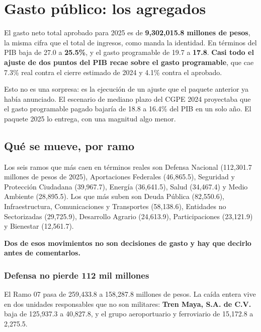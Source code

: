 \chapter{Gasto público: los agregados}

El gasto neto total aprobado para 2025 es de \textbf{9,302,015.8 millones de
pesos}, la misma cifra que el total de ingresos, como manda la identidad. En
términos del PIB baja de 27.0 a \textbf{25.5\%}, y el gasto programable de 19.7 a
\textbf{17.8}. \textbf{Casi todo el ajuste de dos puntos del PIB recae sobre el
gasto programable}, que cae 7.3\% real contra el cierre estimado de 2024 y 4.1\%
contra el aprobado.

Esto no es una sorpresa: es la ejecución de un ajuste que el paquete anterior ya
había anunciado. El escenario de mediano plazo del CGPE 2024 proyectaba que el
gasto programable pagado bajaría de 18.8 a 16.4\% del PIB en un solo año. El
paquete 2025 lo entrega, con una magnitud algo menor.



\section{Qué se mueve, por ramo}



Los seis ramos que más caen en términos reales son Defensa Nacional (112,301.7
millones de pesos de 2025), Aportaciones Federales (46,865.5), Seguridad y
Protección Ciudadana (39,967.7), Energía (36,641.5), Salud (34,467.4) y Medio
Ambiente (28,895.5). Los que más suben son Deuda Pública (82,550.6),
Infraestructura, Comunicaciones y Transportes (58,138.6), Entidades no
Sectorizadas (29,725.9), Desarrollo Agrario (24,613.9), Participaciones (23,121.9)
y Bienestar (12,561.7).

\textbf{Dos de esos movimientos no son decisiones de gasto y hay que decirlo antes
de comentarlos.}

\subsection{Defensa no pierde 112 mil millones}

El Ramo 07 pasa de 259,433.8 a 158,287.8 millones de pesos. La caída entera vive
en dos unidades responsables que no son militares: \textbf{Tren Maya, S.A. de
C.V.} baja de 125,937.3 a 40,827.8, y el grupo aeroportuario y ferroviario de
15,172.8 a 2,275.5.

